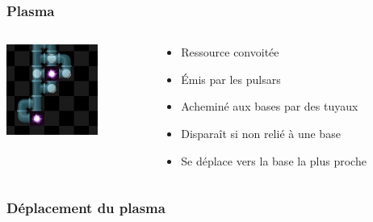 \documentclass{beamer}
\begin{document}
\begin{frame}
	\frametitle{Plasma}
    \begin{columns}[T]
        \begin{column}{.3\textwidth}
            \includegraphics[width=3cm]{pictures/emission}
        \end{column}
        \begin{column}{.7\textwidth}
            \begin{itemize}
                \item Ressource convoitée
                \item Émis par les pulsars
                \item Acheminé aux bases par des tuyaux
                \item Disparaît si non relié à une base
                \item Se déplace vers la base la plus proche
            \end{itemize}
        \end{column}
    \end{columns}
\end{frame}

\begin{frame}
	\frametitle{Déplacement du plasma}
    \begin{columns}[T]
        \begin{column}{.5\textwidth}
             \\
        \end{column}
        \begin{column}{.5\textwidth}
             \\
        \end{column}
    \end{columns}
\end{frame}
\end{document}
